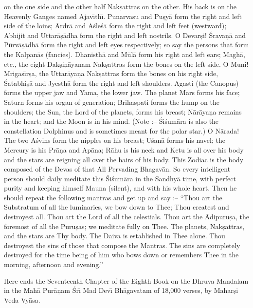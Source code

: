 on the one side and the other half Nak\d{s}attras on the other. His back is on the Heavenly Ganges named Ajav\={\i}th\={\i}. Punarvasu and Pu\d{s}y\=a form the right and left side of the loins; \=Ardr\=a and A\'sle\'s\=a form the right and left feet (westward); Abhijit and Uttar\=a\d{s}\=adha form the right and left nostrils. O Devar\d{s}i! \'Srava\d{n}\=a and P\=urv\=a\d{s}\=adh\=a form the right and left eyes respectively; so say the persons that form the Kalpan\=as (fancies). Dhanisth\=a and M\=ul\=a form his right and left ears; Magh\=a, etc., the eight Dak\d{s}i\d{n}\=ayanam Nak\d{s}attras form the bones on the left side. O Muni! Mrigas\={\i}r\d{s}a, the Uttar\=aya\d{n}a Nak\d{s}attras form the bones on his right side, \'Satabhi\d{s}\=a and Jyesth\=a form the right and left shoulders. Agasti (the Canopus) forms the upper jaw and Yama, the lower jaw. The planet Mars forms his face; Saturn forms his organ of generation; Brihaspati forms the hump on the shoulders; the Sun, the Lord of the planets, forms his breast; N\=ar\=aya\d{n}a remains in the heart; and the Moon is in his mind. (Note :-- \'Si\'sum\=ara is also the constellation Dolphinus and is sometimes meant for the polar star.) O N\=arada! The two A\'svins form the nipples on his breast; U\'san\=a forms his navel; the Mercury is his Pr\=a\d{n}a and Ap\=ana; R\=ahu is his neck and Ketu is all over his body and the stars are reigning all over the hairs of his body. This Zodiac is the body composed of the Devas of that All Pervading Bhagav\=an. So every intelligent person should daily meditate this \'Si\'sum\=ara in the Sandhy\=a time, with perfect purity and keeping himself Mauna (silent), and with his whole heart. Then he should repeat the following mantras and get up and say :-- ``Thou art the Substratum of all the luminaries, we bow down to Thee; Thou createst and destroyest all. Thou art the Lord of all the celestials. Thou art the \=Adipuru\d{s}a, the foremost of all the Puru\d{s}as; we meditate fully on Thee. The planets, Nak\d{s}attras, and the stars are Thy body. The Daiva is established in Thee alone. Thou destroyest the sins of those that compose the Mantras. The sins are completely destroyed for the time being of him who bows down or remembers Thee in the morning, afternoon and evening.''

Here ends the Seventeenth Chapter of the Eighth Book on the Dhruva Mandalam in the Mah\=a Pur\=a\d{n}am \'Sr\={\i} Mad Dev\={\i} Bh\=agavatam of 18,000 verses, by Mahar\d{s}i Veda Vy\=asa.



